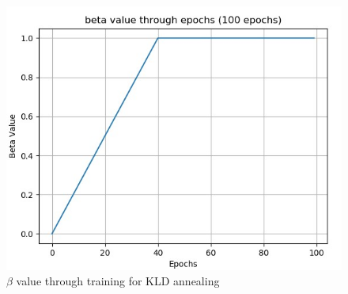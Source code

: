 \documentclass[12pt]{report}
\begin{document}
\begin{figure}[htbp]
    \centering
    \includegraphics[width=0.8 \textwidth]{images/nn/training/beta-annealing.jpg}
    \caption{$\beta$ value through training for KLD annealing}
    \label{fig:beta-annealing}
\end{figure}
\end{document}
